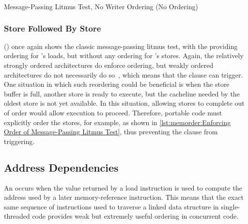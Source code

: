 \begin{listing}

\caption{Message-Passing Litmus Test, No Writer Ordering (No Ordering)}
\label{lst:memorder:Message-Passing Litmus Test; No Writer Ordering (No Ordering)}
\end{listing}

\subsubsection{Store Followed By Store}
\label{sec:memorder:Store Followed By Store}

()
once again shows the classic message-passing litmus test, with the
 providing ordering for 's loads, but without
any ordering for 's stores.
Again, the relatively strongly ordered architectures do enforce ordering,
but weakly ordered architectures do not necessarily do
so~\cite{JadeAlglave2011ppcmem}, which means that the
 clause can trigger.
One situation in which such reordering could be beneficial is when
the store buffer is full, another store is ready to execute, but the
cacheline needed by the oldest store is not yet available.
In this situation, allowing stores to complete out of order would
allow execution to proceed.
Therefore, portable code must explicitly order the stores, for
example, as shown in
\cref{lst:memorder:Enforcing Order of Message-Passing Litmus Test},
thus preventing the  clause from triggering.

\QuickQuizEnd

\subsection{Address Dependencies}
\label{sec:memorder:Address Dependencies}

An \emph{} occurs when the value returned by a load
instruction is used to compute the address used by a later memory-reference
instruction.
This means that the exact same sequence of instructions used to traverse
a linked data structure in single-threaded code provides weak but extremely
useful ordering in concurrent code.

